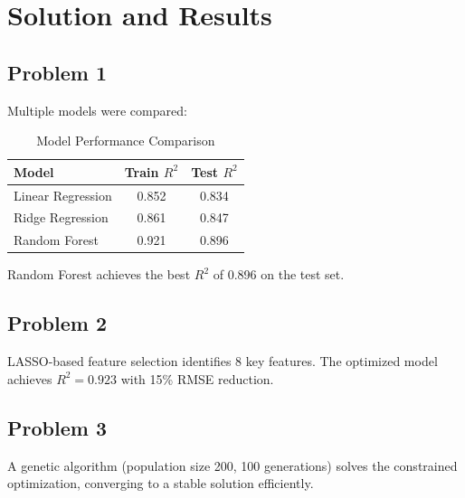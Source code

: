 \section{Solution and Results}

\subsection{Problem 1}
Multiple models were compared:

\begin{table}[htbp]
  \centering
  \caption{Model Performance Comparison}
  \begin{tabular}{lcc}
    \toprule
    \textbf{Model} & \textbf{Train $R^2$} & \textbf{Test $R^2$} \\
    \midrule
    Linear Regression & 0.852 & 0.834 \\
    Ridge Regression   & 0.861 & 0.847 \\
    Random Forest      & 0.921 & 0.896 \\
    \bottomrule
  \end{tabular}
\end{table}

Random Forest achieves the best $R^2$ of 0.896 on the test set.

\subsection{Problem 2}
LASSO-based feature selection identifies 8 key features. The optimized model
achieves $R^2 = 0.923$ with 15\% RMSE reduction.

\subsection{Problem 3}
A genetic algorithm (population size 200, 100 generations) solves the
constrained optimization, converging to a stable solution efficiently.
